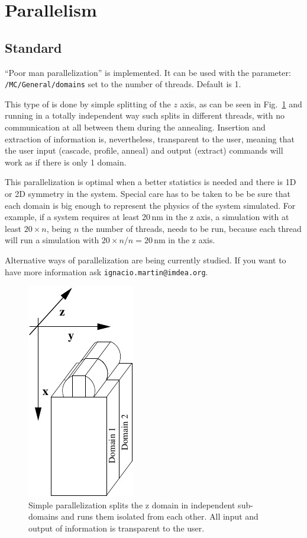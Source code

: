 \section{Parallelism}

\subsection{Standard}

``Poor man parallelization'' is implemented. It can be used with the parameter: \verb+/MC/General/domains+ set to the number of threads. Default is 1.

This type of  is done by simple splitting of the $z$ axis, as can be seen in Fig.~\ref{fig:poor-parallelization} and running in a totally independent way such splits in different threads, with no communication at all between them during the annealing. Insertion and extraction of information is, nevertheless, transparent to the user, meaning that the user input (cascade, profile, anneal) and output (extract) commands will work as if there is only 1 domain.

This parallelization is optimal when a better statistics is needed and there is 1D or 2D symmetry in the system. Special care has to be taken to be be sure that each domain is big enough to represent the physics of the system simulated. For example, if a system requires at least 20\,nm in the z axis, a simulation with at least $20\times n$, being $n$ the number of threads, needs to be run, because each thread will run a simulation with $20\times n / n = 20$\,nm in the z axis.

Alternative ways of parallelization are being currently studied. If you want to have more information ask {\tt ignacio.martin@imdea.org}.

\begin{figure}
\begin{center}
\includegraphics{images/poor-parallelization}
\end{center}
\caption{Simple parallelization splits the z domain in independent sub-domains and runs them isolated from each other. All input and output of information is transparent to the user.}
\label{fig:poor-parallelization}
\end{figure}

